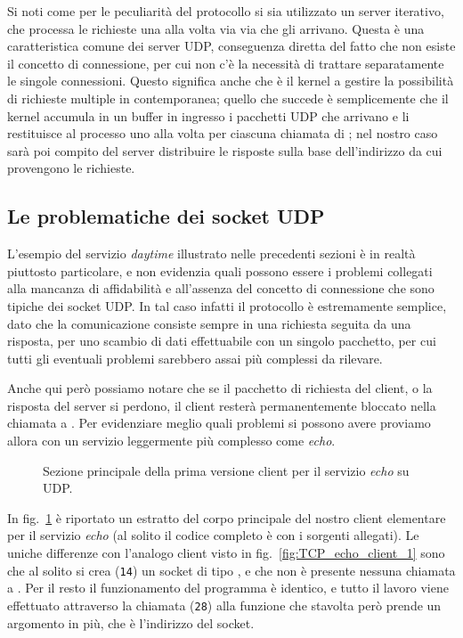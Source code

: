 Si noti come per le peculiarità del protocollo si sia utilizzato un server
iterativo, che processa le richieste una alla volta via via che gli arrivano.
Questa è una caratteristica comune dei server UDP, conseguenza diretta del
fatto che non esiste il concetto di connessione, per cui non c'è la necessità
di trattare separatamente le singole connessioni. Questo significa anche che è
il kernel a gestire la possibilità di richieste multiple in contemporanea;
quello che succede è semplicemente che il kernel accumula in un buffer in
ingresso i pacchetti UDP che arrivano e li restituisce al processo uno alla
volta per ciascuna chiamata di ; nel nostro caso sarà poi
compito del server distribuire le risposte sulla base dell'indirizzo da cui
provengono le richieste.


\subsection{Le problematiche dei socket UDP}
\label{sec:UDP_problems}

L'esempio del servizio \textit{daytime} illustrato nelle precedenti sezioni
è in realtà piuttosto particolare, e non evidenzia quali possono essere i
problemi collegati alla mancanza di affidabilità e all'assenza del concetto di
connessione che sono tipiche dei socket UDP. In tal caso infatti il protocollo
è estremamente semplice, dato che la comunicazione consiste sempre in una
richiesta seguita da una risposta, per uno scambio di dati effettuabile con un
singolo pacchetto, per cui tutti gli eventuali problemi sarebbero assai più
complessi da rilevare.

Anche qui però possiamo notare che se il pacchetto di richiesta del client, o
la risposta del server si perdono, il client resterà permanentemente bloccato
nella chiamata a . Per evidenziare meglio quali problemi si
possono avere proviamo allora con un servizio leggermente più complesso come
\textit{echo}. 

\begin{figure}[!htbp] 
  \footnotesize \centering
  \begin{minipage}[c]{\codesamplewidth}
  \end{minipage} 
  \normalsize
  \caption{Sezione principale della prima versione client per il servizio
    \textit{echo} su UDP.}
  \label{fig:UDP_echo_client}
\end{figure}

In fig.~\ref{fig:UDP_echo_client} è riportato un estratto del corpo principale
del nostro client elementare per il servizio \textit{echo} (al solito il
codice completo è con i sorgenti allegati). Le uniche differenze con l'analogo
client visto in fig.~\ref{fig:TCP_echo_client_1} sono che al solito si crea
(\texttt{\small 14}) un socket di tipo , e che non è
presente nessuna chiamata a . Per il resto il funzionamento del
programma è identico, e tutto il lavoro viene effettuato attraverso la
chiamata (\texttt{\small 28}) alla funzione  che stavolta
però prende un argomento in più, che è l'indirizzo del socket.

